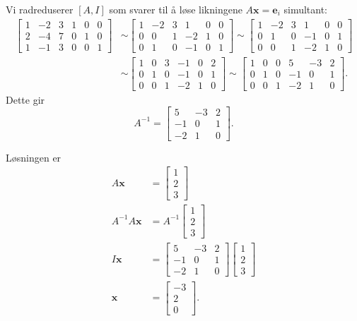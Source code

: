\documentclass[titlepage,a4paper,12pt,norsk]{IMFeksamen}
\newcommand{\V}[1]{\mathbf{#1}}
\newcommand{\vvv}[3]{\begin{bmatrix} #1 \\ #2 \\ #3 \end{bmatrix}}
\newcommand{\x}{\V{x}}
\newcommand{\0}{\V{0}}
\begin{document}
\begin{oppgave}
Vi radreduserer $[A, I]$ som svarer til å løse likningene $A\x=\V{e}_i$ simultant: 
\begin{align*}
\begin{bmatrix}
1 & -2 & 3 & 1 & 0 & 0\\
2 & -4 & 7 & 0 & 1 & 0\\
1 & -1 & 3 & 0 & 0 & 1
\end{bmatrix}
&\sim
\begin{bmatrix}
1 & -2 & 3 & 1  & 0 & 0\\
0 & 0  & 1 & -2 & 1 & 0\\
0 & 1  & 0 & -1 & 0 & 1
\end{bmatrix}
\sim 
\begin{bmatrix}
1 & -2 & 3 & 1  & 0 & 0\\
0 & 1  & 0 & -1 & 0 & 1\\
0 & 0  & 1 & -2 & 1 & 0
\end{bmatrix}\\
&\sim
\begin{bmatrix}
1 & 0 & 3 & -1 & 0 & 2\\
0 & 1 & 0 & -1 & 0 & 1\\
0 & 0 & 1 & -2 & 1 & 0
\end{bmatrix}
\sim
\begin{bmatrix}
1 & 0 & 0 & 5  & -3 & 2\\
0 & 1 & 0 & -1 & 0  & 1\\
0 & 0 & 1 & -2 & 1  & 0
\end{bmatrix}.
\end{align*}
Dette gir
\[
A^{-1}=
\begin{bmatrix}
5  & -3 & 2\\
-1 & 0  & 1\\
-2 & 1  & 0
\end{bmatrix}.
\]

Løsningen er
\begin{align*}
A\x&=\vvv{1}{2}{3}\\
A^{-1}A\x&=A^{-1}\vvv{1}{2}{3}\\
I\x&=\begin{bmatrix}
5  & -3 & 2\\
-1 & 0  & 1\\
-2 & 1  & 0
\end{bmatrix}
\vvv{1}{2}{3}\\
\x&=\vvv{-3}{2}{0}.
\end{align*}
\end{oppgave}
\end{document}
